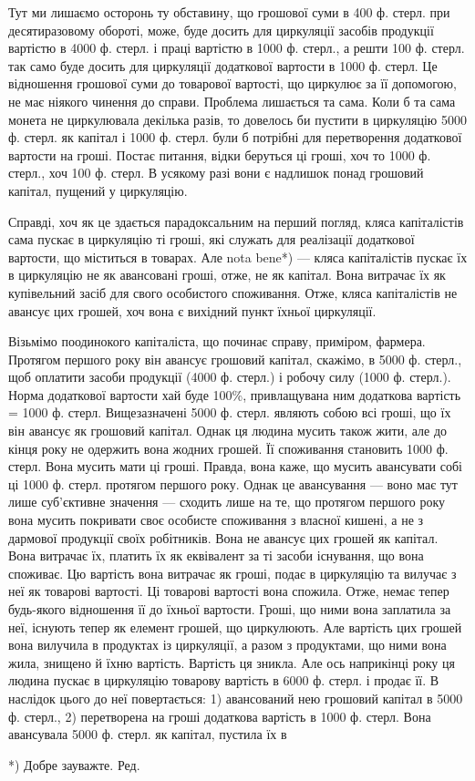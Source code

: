 Тут ми лишаємо осторонь ту обставину, що грошової суми в 400
ф. стерл. при десятиразовому обороті, може, буде досить для циркуляції
засобів продукції вартістю в 4000 ф. стерл. і праці вартістю в 1000 ф.
стерл., а решти 100 ф. стерл. так само буде досить для циркуляції додаткової
вартости в 1000 ф. стерл. Це відношення грошової суми до товарової
вартості, що циркулює за її допомогою, не має ніякого чинення до
справи. Проблема лишається та сама. Коли б та сама монета не циркулювала
декілька разів, то довелось би пустити в циркуляцію 5000 ф. стерл.
як капітал і 1000 ф. стерл. були б потрібні для перетворення додаткової
вартости на гроші. Постає питання, відки беруться ці гроші, хоч то
1000 ф. стерл., хоч 100 ф. стерл. В усякому разі вони є надлишок понад
грошовий капітал, пущений у циркуляцію.

Справді, хоч як це здається парадоксальним на перший погляд, кляса
капіталістів сама пускає в циркуляцію ті гроші, які служать для реалізації
додаткової вартости, що міститься в товарах. Але nota bene*) — кляса
капіталістів пускає їх в циркуляцію не як авансовані гроші, отже, не як
капітал. Вона витрачає їх як купівельний засіб для свого особистого
споживання. Отже, кляса капіталістів не авансує цих грошей, хоч вона
є вихідний пункт їхньої циркуляції.

Візьмімо поодинокого капіталіста, що починає справу, приміром,
фармера. Протягом першого року він авансує грошовий капітал, скажімо,
в 5000 ф. стерл., щоб оплатити засоби продукції (4000 ф. стерл.) і робочу
силу (1000 ф. стерл.). Норма додаткової вартости хай буде 100\%, привлащувана
ним додаткова вартість = 1000 ф. стерл. Вищезазначені 5000 ф.
стерл. являють собою всі гроші, що їх він авансує як грошовий капітал.
Однак ця людина мусить також жити, але до кінця року не одержить
вона жодних грошей. Її споживання становить 1000 ф. стерл. Вона мусить
мати ці гроші. Правда, вона каже, що мусить авансувати собі ці 1000 ф. стерл.
протягом першого року. Однак це авансування — воно має тут лише
суб’єктивне значення — сходить лише на те, що протягом першого року
вона мусить покривати своє особисте споживання з власної кишені, а не
з дармової продукції своїх робітників. Вона не авансує цих грошей як
капітал. Вона витрачає їх, платить їх як еквівалент за ті засоби існування,
що вона споживає. Цю вартість вона витрачає як гроші, подає в
циркуляцію та вилучає з неї як товарові вартості. Ці товарові вартості
вона спожила. Отже, немає тепер будь-якого відношення її до їхньої
вартости. Гроші, що ними вона заплатила за неї, існують тепер як елемент
грошей, що циркулюють. Але вартість цих грошей вона вилучила
в продуктах із циркуляції, а разом з продуктами, що ними вона жила,
знищено й їхню вартість. Вартість ця зникла. Але ось наприкінці року
ця людина пускає в циркуляцію товарову вартість в 6000 ф. стерл. і продає її.
В наслідок цього до неї повертається: 1) авансований нею грошовий
капітал в 5000 ф. стерл., 2) перетворена на гроші додаткова вартість в
1000 ф. стерл. Вона авансувала 5000 ф. стерл. як капітал, пустила їх в

*) Добре зауважте. Ред.
